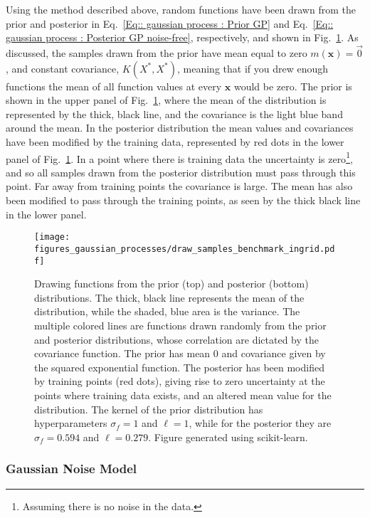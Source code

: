 \documentclass[twoside,english]{uiofysmaster}
\begin{document}
Using the method described above, random functions have been drawn from the prior and posterior in Eq.~\ref{Eq:: gaussian process : Prior GP} and Eq.~\ref{Eq:: gaussian process : Posterior GP noise-free}, respectively, and shown in Fig.~\ref{Fig:: gaussian process : prior posterior drawn samples}. As discussed, the samples drawn from the prior have mean equal to zero $m(\textbf{x})=\vec{0}$, and constant covariance, $K(X^*, X^*)$, meaning that if you drew enough functions the mean of all function values at every $\textbf{x}$ would be zero. The prior is shown in the upper panel of Fig.~\ref{Fig:: gaussian process : prior posterior drawn samples}, where the mean of the distribution is represented by the thick, black line, and the covariance is the light blue band around the mean. In the posterior distribution the mean values and covariances have been modified by the training data, represented by red dots in the lower panel of Fig.~\ref{Fig:: gaussian process : prior posterior drawn samples}. In a point where there is training data the uncertainty is zero\footnote{Assuming there is no noise in the data.}, and so all samples drawn from the posterior distribution must pass through this point. Far away from training points the covariance is large. The mean has also been modified to pass through the training points, as seen by the thick black line in the lower panel.

\begin{figure}
\centering
\texttt{[image: figures\_gaussian\_processes/draw\_samples\_benchmark\_ingrid.pdf]}
\caption{Drawing functions from the prior (top) and posterior (bottom) distributions. The thick, black line represents the mean of the distribution, while the shaded, blue area is the variance. The multiple colored lines are functions drawn randomly from the prior and posterior distributions, whose correlation are dictated by the covariance function. The prior has mean 0 and covariance given by the squared exponential function. The posterior has been modified by training points (red dots), giving rise to zero uncertainty at the points where training data exists, and an altered mean value for the distribution. The kernel of the prior distribution has hyperparameters $\sigma_f = 1$ and $\ell = 1$, while for the posterior they are $\sigma_f = 0.594$ and $\ell = 0.279$. Figure generated using scikit-learn.}
\label{Fig:: gaussian process : prior posterior drawn samples}
\end{figure}

\subsubsection{Gaussian Noise Model}\label{Sec: gaussian process : Gaussian Noise Model}
\end{document}
